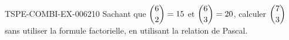 \begin{exercice}{TSPE-COMBI-EX-006}{2}{10}
Sachant que $\dbinom{6}{2}=15$ et $\dbinom{6}{3}=20$, calculer $\dbinom{7}{3}$ sans utiliser la formule factorielle, en utilisant la relation de Pascal.
\end{exercice}
